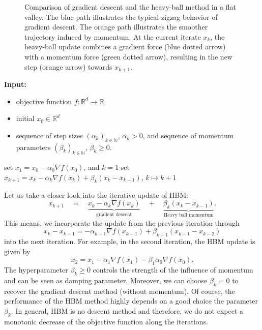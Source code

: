 \documentclass[12pt,openany]{book}
\theoremstyle{definition}
\theoremstyle{definition}
\newcommand{\N}{\mathbb{N}}
\newcommand{\R}{\mathbb{R}}
\begin{document}
\begin{figure}[!htb]
\caption{Comparison of gradient descent and the heavy-ball method in a flat valley.
The blue path illustrates the typical zigzag behavior of gradient descent.
The orange path illustrates the smoother trajectory induced by momentum.
At the current iterate $x_k$, the heavy-ball update combines a gradient force
(blue dotted arrow) with a momentum force (green dotted arrow), resulting in the new step
(orange arrow) towards $x_{k+1}$.}
\label{fig:heavy-ball-vs-gd}
\end{figure}


\begin{algorithm}[htb!]
\begin{algorithmic}[1]
\State \textbf{Input:} \begin{itemize}
 \item objective function $f:\R^d\to\R$
 \item initial $x_0\in\R^d$
 \item sequence of step sizes $(\alpha_k)_{k\in\N}$, $\alpha_k>0$, and sequence of momentum parameters $(\beta_k)_{k\in\N}$, $\beta_k\ge0$.
 \end{itemize}
 \State set $x_1=x_0-\alpha_0\nabla f(x_0)$, and $k=1$
	\State set $x_{k+1} = x_k -\alpha_k \nabla f(x_k)+\beta_k (x_k-x_{k-1})$, $k \mapsto k+1$
\EndWhile
\end{algorithmic}
 \caption{Heavy ball method}\label{alg:HBM}
\end{algorithm}

Let us take a closer look into the iterative update of HBM: 
\[x_{k+1} \quad = \quad \underbrace{x_k - \alpha_k \nabla f(x_k)}_{\text{gradient descent}} \quad + \quad \underbrace{\beta_k(x_k-x_{k-1})}_{\text{Heavy ball momentum}}. \]
This means, we incorporate the update from the previous iteration through
\[x_k-x_{k-1} = -\alpha_{k-1}\nabla f(x_{k-1}) + \beta_{k-1} (x_{k-1}-x_{k-2}) \]
into the next iteration. For example, in the second iteration, the HBM update is given by
\[x_2 = x_1 - \alpha_1\nabla f(x_1) - \beta_1 \alpha_0\nabla f(x_0). \]
The hyperparameter $\beta_k\ge0$ controls the strength of the influence of momentum and can be seen as damping parameter. Moreover, we can choose $\beta_k =0$ to recover the gradient descent method (without momentum).  Of course, the performance of the HBM method highly depends on a good choice the parameter $\beta_k$. In general, HBM is no descent method and therefore, we do not expect a monotonic decrease of the objective function along the iterations.
\end{document}
